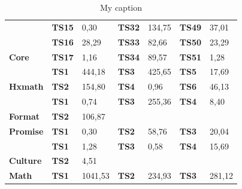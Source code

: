 \begin{table}[]
{\begin{tabular}{|l|l|l|l|l|l|l|}
		& \textbf{TS15}      & 0,30                            & \textbf{TS32}      & 134,75                         & \textbf{TS49}      & 37,01                          \\ \cline{2-7} 
		& \textbf{TS16}      & 28,29                           & \textbf{TS33}      & 82,66                          & \textbf{TS50}      & 23,29                          \\ \cline{2-7} 
		\multirow{-17}{*}{\textbf{Core}}            & \textbf{TS17}      & 1,16                            & \textbf{TS34}      & 89,57                          & \textbf{TS51}      & 1,28                           \\ \hline
		& \textbf{TS1}       & \cellcolor[HTML]{C0C0C0}444,18  & \textbf{TS3}       & \cellcolor[HTML]{C0C0C0}425,65 & \textbf{TS5}       & 17,69                          \\ \cline{2-7} 
		\multirow{-2}{*}{\textbf{Hxmath}}  & \textbf{TS2}       & 154,80                          & \textbf{TS4}       & 0,96                           & \textbf{TS6}       & 46,13                          \\ \hline
		& \textbf{TS1}       & 0,74                            & \textbf{TS3}       & 255,36                         & \textbf{TS4}       & 8,40                           \\ \cline{2-7} 
		\multirow{-2}{*}{\textbf{Format}}  & \textbf{TS2}       & 106,87                          & \multicolumn{4}{l|}{\textbf{}}                                                                            \\ \hline
		\textbf{Promise}                   & \textbf{TS1}       & 0,30                            & \textbf{TS2}       & 58,76                          & \textbf{TS3}       & 20,04                          \\ \hline
		& \textbf{TS1}       & 1,28                            & \textbf{TS3}       & 0,58                           & \textbf{TS4}       & 15,69                          \\ \cline{2-7} 
		\multirow{-2}{*}{\textbf{Culture}} & \textbf{TS2}       & 4,51                            & \multicolumn{4}{l|}{}                                                                                     \\ \hline
		\textbf{Math}                      & \textbf{TS1}       & \cellcolor[HTML]{C0C0C0}1041,53 & \textbf{TS2}       & 234,93                         & \textbf{TS3}       & 281,12                         \\ \hline
	\end{tabular}%
}
	\caption{My caption}
	\label{my-label}
\end{table}


